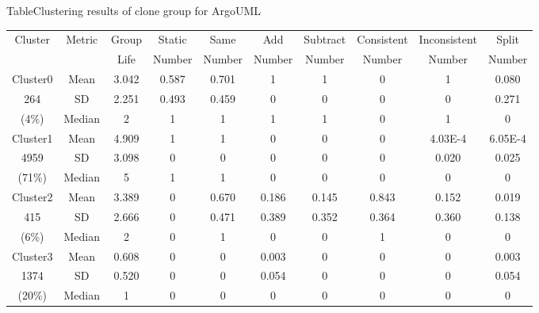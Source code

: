 \begin{table}[htbp]
{Table$\!$}{Clustering results of clone group for ArgoUML}
\vspace{0.5em}
\centering
\footnotesize
\begin{tabular}{cccccccccc}
\toprule[1.5pt]
\multirow{2}{*}{Cluster}&\multirow{2}{*}{Metric}&Group&Static &Same &Add &Subtract &Consistent &	Inconsistent &Split \\ 
&&Life& Number& Number& Number& Number& Number&	 Number& Number\\ 
\midrule[1pt]
Cluster0&Mean&	3.042	&0.587	&0.701	&1	&1	&0	&1	&0.080\\ 
264&SD&2.251	&0.493	&0.459	&0	&0	&0	&0	&0.271\\ 
(4\%)&Median	&2	&1	&1	&1  &1	&0	&1	&0\\ 
\hline
Cluster1&Mean	&4.909&1	&1	&0	&0	&0	&4.03E-4	&6.05E-4\\ 
4959&SD&3.098&0	&0	&0	&0	&0	&0.020&0.025\\ 
(71\%)&Median	&5	&1	&1	&0	&0	&0	&0	&0\\ 
\hline
Cluster2&Mean	&3.389&0	&0.670&0.186&0.145&0.843	&0.152&0.019\\ 
415&SD&2.666&0	&0.471&0.389&0.352&0.364	&0.360&0.138\\ 
(6\%)&Median	&2	&0	&1	&0	&0	&1	&0	&0\\ 
\hline
Cluster3&Mean	&0.608&0	&0	&0.003&0	&0	&0	&0.003\\ 
1374&SD&0.520&0	&0	&0.054&0	&0	&0	&0.054\\ 
(20\%)&Median	&1	&0	&0	&0	&0	&0	&0	&0\\
\bottomrule[1.5pt]
\end{tabular}
\end{table}

